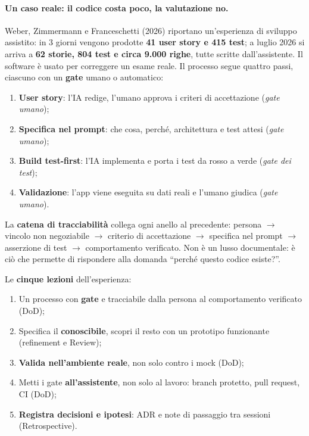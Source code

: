 \documentclass[12pt]{extarticle}
\begin{document}
\paragraph{Un caso reale: il codice costa poco, la valutazione no.}
Weber, Zimmermann e Franceschetti (2026) riportano un'esperienza di sviluppo assistito: in 3 giorni vengono prodotte \textbf{41 user story e 415 test}; a luglio 2026 si arriva a \textbf{62 storie, 804 test e circa 9.000 righe}, tutte scritte dall'assistente. Il software è usato per correggere un esame reale. Il processo segue quattro passi, ciascuno con un \textbf{gate} umano o automatico:
\begin{enumerate}
    \item \textbf{User story}: l'IA redige, l'umano approva i criteri di accettazione (\textit{gate umano});
    \item \textbf{Specifica nel prompt}: che cosa, perché, architettura e test attesi (\textit{gate umano});
    \item \textbf{Build test-first}: l'IA implementa e porta i test da rosso a verde (\textit{gate dei test});
    \item \textbf{Validazione}: l'app viene eseguita su dati reali e l'umano giudica (\textit{gate umano}).
\end{enumerate}
\noindent La \textbf{catena di tracciabilità} collega ogni anello al precedente: persona $\to$ vincolo non negoziabile $\to$ criterio di accettazione $\to$ specifica nel prompt $\to$ asserzione di test $\to$ comportamento verificato. Non è un lusso documentale: è ciò che permette di rispondere alla domanda ``perché questo codice esiste?''.

\noindent Le \textbf{cinque lezioni} dell'esperienza:
\begin{enumerate}
    \item Un processo con \textbf{gate} e tracciabile dalla persona al comportamento verificato (DoD);
    \item Specifica il \textbf{conoscibile}, scopri il resto con un prototipo funzionante (refinement e Review);
    \item \textbf{Valida nell'ambiente reale}, non solo contro i mock (DoD);
    \item Metti i gate \textbf{all'assistente}, non solo al lavoro: branch protetto, pull request, CI (DoD);
    \item \textbf{Registra decisioni e ipotesi}: ADR e note di passaggio tra sessioni (Retrospective).
\end{enumerate}
\end{document}
